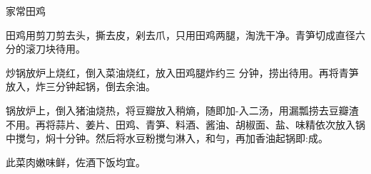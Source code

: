 \begin{recipe}{家常田鸡}

\ingredients


\cooking

\step 田鸡用剪刀剪去头，撕去皮，剁去爪，只用田鸡两腿，淘洗干净。青笋切成直径六分的滚刀块待用。

炒锅放炉上烧红，倒入菜油烧红，放入田鸡腿炸约三 分钟，捞出待用。再将青笋放入，炸三分钟起锅，倒去余油。

\step 锅放炉上，倒入猪油烧热，将豆瓣放入稍熵，随即加-入二汤，用漏瓢捞去豆瓣渣不用。再将蒜片、姜片、田鸡、青笋、料酒、酱油、胡椒面、盐、味精依次放入锅中搅匀，焖十分钟。然后将水豆粉搅匀淋入，和勻，再加香油起锅即:成。

\notes

此菜肉嫩味鲜，佐酒下饭均宜。

\end{recipe}

